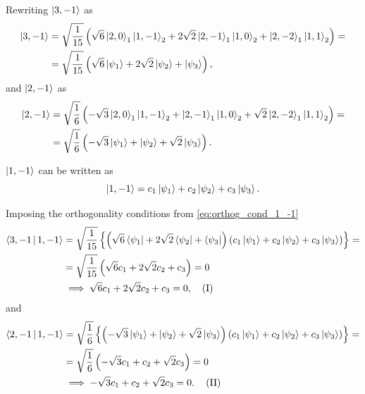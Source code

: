 Rewriting $\Ket{3,-1}$ as 
\begin{align}
    \notag
    \Ket{3,-1} &=
    \sqrt{\frac{1}{15}} \left( \sqrt{6} \Ket{2,0}_1 \Ket{1,-1}_2 + 2\sqrt{2} \Ket{2,-1}_1 \Ket{1,0}_2 + \Ket{2,-2}_1 \Ket{1,1}_2 \right)
    = \\
    &=
    \sqrt{\frac{1}{15}} \left( \sqrt{6} \Ket{\psi_1} + 2\sqrt{2} \Ket{\psi_2} + \Ket{\psi_3} \right),
\end{align}
and $\Ket{2,-1}$ as 
\begin{align}
    \notag
    \Ket{2,-1}
    &= 
    \sqrt{\frac{1}{6}} \left( - \sqrt{3} \Ket{2,0}_1 \Ket{1,-1}_2 + \Ket{2,-1}_1 \Ket{1,0}_2 + \sqrt{2} \Ket{2,-2}_1  \Ket{1,1}_2 \right)
    =
    \\
    &=
    \sqrt{\frac{1}{6}} \left( - \sqrt{3} \Ket{\psi_1} + \Ket{\psi_2} + \sqrt{2} \Ket{\psi_3} \right).
\end{align}

$\Ket{1,-1}$ can be written as 
\begin{equation}\label{eq:ket_1_-1_aux}
    \Ket{1,-1} =
    c_1 \Ket{\psi_1} + c_2 \Ket{\psi_2} + c_3 \Ket{\psi_3}.
\end{equation}

Imposing the orthogonality conditions from \cref{eq:orthog_cond_1_-1} 
\begin{align}    
    \notag
    \Braket{3,-1 | 1,-1}
    &=
    \sqrt{\frac{1}{15}} \left\{
        \left( \sqrt{6} \Bra{\psi_1} + 2\sqrt{2} \Bra{\psi_2} + \Bra{\psi_3} \right)
        \left( c_1 \Ket{\psi_1} + c_2 \Ket{\psi_2} + c_3 \Ket{\psi_3} \right)
    \right\}
    =
    \\
    \notag
    &=
    \sqrt{\frac{1}{15}} \left(
        \sqrt{6} c_1 + 2\sqrt{2} c_2 + c_3
    \right) = 0
    \\
    & \implies
    \sqrt{6} c_1 + 2\sqrt{2} c_2 + c_3 = 0,
    \quad \left( \mathrm{I} \right)
\end{align}
and
\begin{align}    
    \notag
    \Braket{2,-1 | 1,-1}
    &=
    \sqrt{\frac{1}{6}} \left\{
        \left( - \sqrt{3} \Ket{\psi_1} + \Ket{\psi_2} + \sqrt{2} \Ket{\psi_3} \right)
        \left( c_1 \Ket{\psi_1} + c_2 \Ket{\psi_2} + c_3 \Ket{\psi_3} \right)
    \right\}
    =
    \\
    \notag
    &=
    \sqrt{\frac{1}{6}} \left(
        -\sqrt{3} c_1 + c_2 + \sqrt{2} c_3
    \right) = 0
    \\
    & \implies
        -\sqrt{3} c_1 + c_2 + \sqrt{2} c_3 = 0.
    \quad \left( \mathrm{II} \right)
\end{align}

